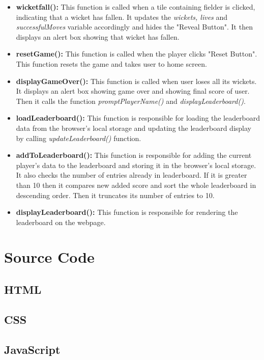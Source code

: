 \documentclass{article}
\begin{document}
\begin{itemize}
\item \textbf{wicketfall():} This function is called when a tile containing fielder is clicked, indicating that a wicket has fallen. It updates the \emph{wickets, lives} and \emph{successfulMoves} variable accordingly and hides the "Reveal Button". It then displays an alert box showing that wicket has fallen.
\item \textbf{resetGame():} This function is called when the player clicks "Reset Button". This function resets the game and takes user to home screen.
\item \textbf{displayGameOver():} This function is called when user loses all its wickets. It displays an alert box showing game over and showing final score of user. Then it calls the function \emph{promptPlayerName()} and \emph{displayLeaderboard()}.
\item \textbf{loadLeaderboard():} This function is responsible for loading the leaderboard data from the browser's local storage and updating the leaderboard display by calling \emph{updateLeaderboard()} function.
\item \textbf{addToLeaderboard():} This function is responsible for adding the current player's data to the leaderboard and storing it in the browser's local storage. It also checks the number of entries already in leaderboard. If it is greater than 10 then it compares new added score and sort the whole leaderboard in descending order. Then it truncates its number of entries to 10.
\item \textbf{displayLeaderboard():} This function is responsible for rendering the leaderboard on the webpage.
\end{itemize}
\clearpage
\section{Source Code}
\subsection{HTML}

\subsection{CSS}

\subsection{JavaScript}

\printbibliography
\end{document}
